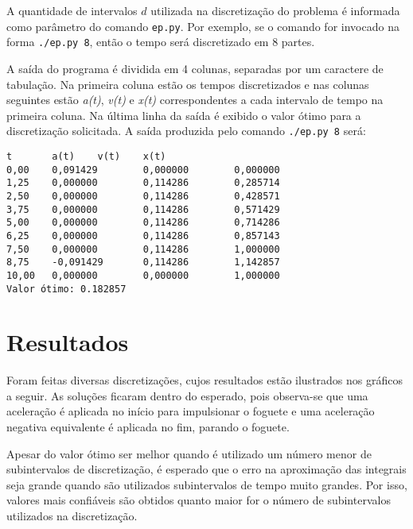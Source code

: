 \documentclass[10pt,oneside,a4paper]{article}
\begin{document}
A quantidade de intervalos $d$ utilizada na discretização do problema é informada como parâmetro do comando \texttt{ep.py}. Por exemplo, se o comando for invocado na forma \texttt{./ep.py 8}, então o tempo será discretizado em 8 partes.

A saída do programa é dividida em 4 colunas, separadas por um caractere de tabulação. Na primeira coluna estão os tempos discretizados e nas colunas seguintes estão \emph{a(t)}, \emph{v(t)} e \emph{x(t)} correspondentes a cada intervalo de tempo na primeira coluna. Na última linha da saída é exibido o valor ótimo para a discretização solicitada. A saída produzida pelo comando \texttt{./ep.py 8} será:

\begin{verbatim}
t       a(t)    v(t)    x(t)
0,00    0,091429        0,000000        0,000000
1,25    0,000000        0,114286        0,285714
2,50    0,000000        0,114286        0,428571
3,75    0,000000        0,114286        0,571429
5,00    0,000000        0,114286        0,714286
6,25    0,000000        0,114286        0,857143
7,50    0,000000        0,114286        1,000000
8,75    -0,091429       0,114286        1,142857
10,00   0,000000        0,000000        1,000000
Valor ótimo: 0.182857
\end{verbatim}

\section{Resultados}

Foram feitas diversas discretizações, cujos resultados estão ilustrados nos gráficos a seguir. As soluções ficaram dentro do esperado, pois observa-se que uma aceleração é aplicada no início para impulsionar o foguete e uma aceleração negativa equivalente é aplicada no fim, parando o foguete.

Apesar do valor ótimo ser melhor quando é utilizado um número menor de subintervalos de discretização, é esperado que o erro na aproximação das integrais seja grande quando são utilizados subintervalos de tempo muito grandes. Por isso, valores mais confiáveis são obtidos quanto maior for o número de subintervalos utilizados na discretização.

\bigskip
\end{document}
